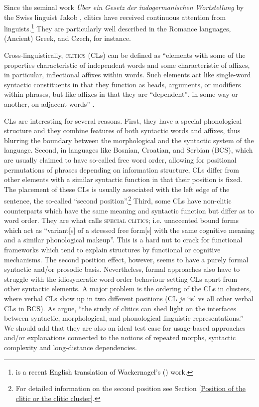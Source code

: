 \noindent Since the seminal work \textit{Über} \textit{ein} \textit{Gesetz} \textit{der} \textit{indogermanischen} \textit{Wortstellung} by the Swiss linguist Jakob \citet{Wackernagel92}, clitics have received continuous attention from linguists.\footnote{\textcolor{black}{\citet{WSM20} is a recent English translation of Wackernagel's (\citeyear{Wackernagel92}) work.}} They are particularly well described in the Romance languages, (Ancient) Greek, and Czech, for instance. 

Cross-linguistically, \textsc{clitics} (CLs) can be defined as ``elements with some of the properties charac­teristic of independent words and some characteristic of affixes, in particular, inflec­­tional affixes within words. Such elements act like single-word syntactic constituents in that they function as heads, arguments, or modifiers within phrases, but like affixes in that they are  ``dependent'', in some way or another, on adjacent words'' \citet[xii]{Zwicky94}.

CLs are interesting for several reasons. First, they have a special phonological structure and they combine features of both syntactic words and affixes, thus blurring the boundary between the morphological and the syntactic system of the language. Second, in languages like Bosnian, Croatian, and Serbian (BCS), which are usually claimed to have so-called free word order, allowing for positional permutations of phrases depending on information structure, CLs differ from other elements with a similar syntactic function in that their position is fixed. The placement of these CLs is usually associated with the left edge of the sentence, the so-called ``second position''.\footnote{For detailed information on the second position see Section \ref{Position of the clitic or the clitic cluster}.} Third, some CLs have non-clitic counterparts which have the same meaning and syntactic function but differ as to word order. They are what \citet[3]{Zwicky77} calls \textsc{special clitics}; i.e. unaccented bound forms which act as ``variant[s] of a stressed free form[s] with the same cognitive meaning and a similar phonological makeup''. This is a hard nut to crack for functional frameworks which tend to explain structures by functional or cognitive mechanisms. The second position effect, however, seems to have a purely formal syntactic and/or prosodic basis. Nevertheless, formal approaches also have to struggle with the idiosyncratic word order behaviour setting CLs apart from other syntactic elements. A major problem is the ordering of the CLs in clusters, where verbal CLs show up in two different positions (CL \textit{je} `is' vs all other verbal CLs in BCS). As \citet[12]{FJL04} argue, ``the study of clitics can shed light on the interfaces between syntactic, morphological, and phonological linguistic representations.'' We should add that they are also an ideal test case for usage-based approaches and/or explanations connected to the notions of repeated morphs, syntactic complexity and long-distance dependencies.

